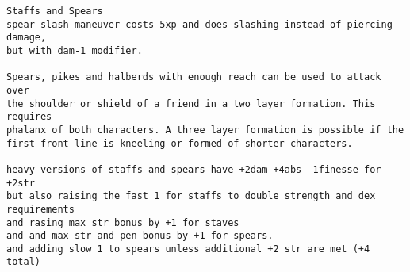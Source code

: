 \goodbreak \small \begin{samepage} \begin{verbatim}
Staffs and Spears
spear slash maneuver costs 5xp and does slashing instead of piercing damage, 
but with dam-1 modifier.

Spears, pikes and halberds with enough reach can be used to attack over 
the shoulder or shield of a friend in a two layer formation. This requires 
phalanx of both characters. A three layer formation is possible if the 
first front line is kneeling or formed of shorter characters.

heavy versions of staffs and spears have +2dam +4abs -1finesse for +2str
but also raising the fast 1 for staffs to double strength and dex requirements
and rasing max str bonus by +1 for staves 
and and max str and pen bonus by +1 for spears.
and adding slow 1 to spears unless additional +2 str are met (+4 total)


\end{verbatim}
\end{samepage}
